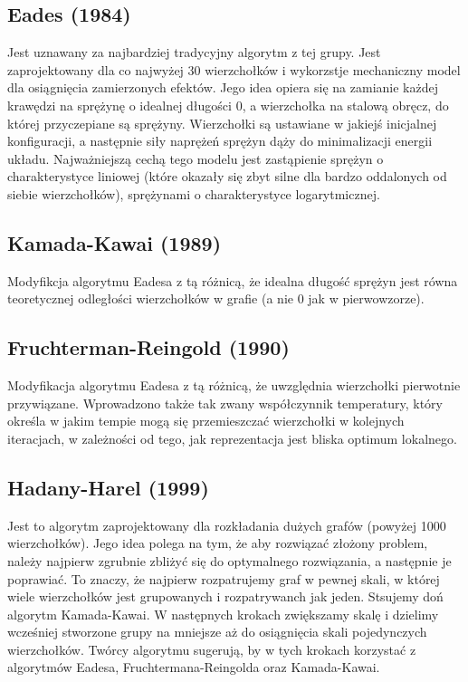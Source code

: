 \documentclass[a4paper,11pt]{article}
\begin{document}
\subsection{Eades (1984)}
Jest uznawany za najbardziej tradycyjny algorytm z tej grupy. Jest zaprojektowany dla co najwyżej 30 wierzchołków i wykorzstje mechaniczny model dla osiągnięcia zamierzonych efektów. Jego idea opiera się na zamianie każdej krawędzi na sprężynę o idealnej długości 0, a wierzchołka na stalową obręcz, do której przyczepiane są sprężyny. Wierzchołki są ustawiane w jakiejś inicjalnej konfiguracji, a następnie siły naprężeń sprężyn dąży do minimalizacji energii układu. Najważniejszą cechą tego modelu jest zastąpienie sprężyn o charakterystyce liniowej (które okazały się zbyt silne dla bardzo oddalonych od siebie wierzchołków), sprężynami o charakterystyce logarytmicznej.

\subsection{Kamada-Kawai (1989)}
Modyfikcja algorytmu Eadesa z tą różnicą, że idealna długość sprężyn jest równa teoretycznej odległości wierzchołków w grafie (a nie 0 jak w pierwowzorze).

\subsection{Fruchterman-Reingold (1990)}
Modyfikacja algorytmu Eadesa z tą różnicą, że uwzględnia wierzchołki pierwotnie przywiązane. Wprowadzono także tak zwany współczynnik temperatury, który określa w jakim tempie mogą się przemieszczać wierzchołki w kolejnych iteracjach, w zależności od tego, jak reprezentacja jest bliska optimum lokalnego.

\subsection{Hadany-Harel (1999)}
Jest to algorytm zaprojektowany dla rozkładania dużych grafów (powyżej 1000 wierzchołków). Jego idea polega na tym, że aby rozwiązać złożony problem, należy najpierw zgrubnie zbliżyć się do optymalnego rozwiązania, a następnie je poprawiać. To znaczy, że najpierw rozpatrujemy graf w pewnej skali, w której wiele wierzchołków jest grupowanych i rozpatrywanch jak jeden. Stsujemy doń algorytm Kamada-Kawai. W następnych krokach zwiększamy skalę i dzielimy wcześniej stworzone grupy na mniejsze aż do osiągnięcia skali pojedynczych wierzchołków. Twórcy algorytmu sugerują, by w tych krokach korzystać z algorytmów Eadesa, Fruchtermana-Reingolda oraz Kamada-Kawai.
\end{document}
